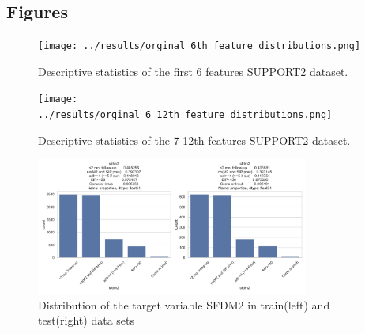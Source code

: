 

\subsection{Figures}

\begin{figure}[!h]
    \centering
    \texttt{[image: ../results/orginal\_6th\_feature\_distributions.png]}
    \caption{Descriptive statistics of the first 6 features SUPPORT2 dataset.}
    \label{fig:first_6_features}
\end{figure}

\begin{figure}[!h]
    \centering
    \texttt{[image: ../results/orginal\_6\_12th\_feature\_distributions.png]}
    \caption{Descriptive statistics of the 7-12th features SUPPORT2 dataset.}
    \label{fig:7_12_features}
\end{figure}


\begin{figure}[!h]
    \centering
    \includegraphics[width=0.8\textwidth]{../results/train_test_target_proportion.png}
    \caption{Distribution of the target variable SFDM2 in train(left) and test(right) data sets}
    \label{fig:train_test_target_proportion}
    \end{figure}

    